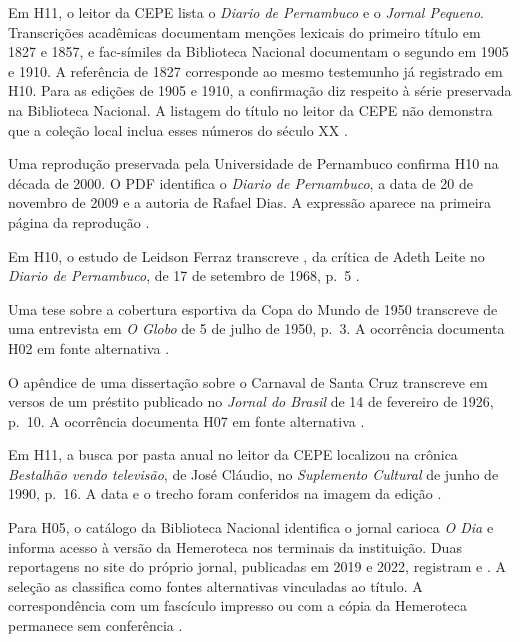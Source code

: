 Em H11, o leitor da CEPE lista o \textit{Diario de Pernambuco} e o \textit{Jornal Pequeno}. Transcrições acadêmicas documentam menções lexicais do primeiro título em 1827 e 1857, e fac-símiles da Biblioteca Nacional documentam o segundo em 1905 e 1910. A referência de 1827 corresponde ao mesmo testemunho já registrado em H10. Para as edições de 1905 e 1910, a confirmação diz respeito à série preservada na Biblioteca Nacional. A listagem do título no leitor da CEPE não demonstra que a coleção local inclua esses números do século XX \cite{acervoD107,acervoD115,acervoD116,acervoD117}.

Uma reprodução preservada pela Universidade de Pernambuco confirma H10 na década de 2000. O PDF identifica o \textit{Diario de Pernambuco}, a data de 20 de novembro de 2009 e a autoria de Rafael Dias. A expressão  aparece na primeira página da reprodução \cite{acervoD118}.

Em H10, o estudo de Leidson Ferraz transcreve , da crítica de Adeth Leite no \textit{Diario de Pernambuco}, de 17 de setembro de 1968, p.~5 \cite{acervoD119}.

Uma tese sobre a cobertura esportiva da Copa do Mundo de 1950 transcreve  de uma entrevista em \textit{O Globo} de 5 de julho de 1950, p.~3. A ocorrência documenta H02 em fonte alternativa \cite{acervoD120}.

O apêndice de uma dissertação sobre o Carnaval de Santa Cruz transcreve  em versos de um préstito publicado no \textit{Jornal do Brasil} de 14 de fevereiro de 1926, p.~10. A ocorrência documenta H07 em fonte alternativa \cite{acervoD121}.

Em H11, a busca por pasta anual no leitor da CEPE localizou  na crônica \textit{Bestalhão vendo televisão}, de José Cláudio, no \textit{Suplemento Cultural} de junho de 1990, p.~16. A data e o trecho foram conferidos na imagem da edição \cite{acervoD122}.

Para H05, o catálogo da Biblioteca Nacional identifica o jornal carioca \textit{O Dia} e informa acesso à versão da Hemeroteca nos terminais da instituição. Duas reportagens no site do próprio jornal, publicadas em 2019 e 2022, registram  e . A seleção as classifica como fontes alternativas vinculadas ao título. A correspondência com um fascículo impresso ou com a cópia da Hemeroteca permanece sem conferência \cite{acervoD125,acervoD126}.

